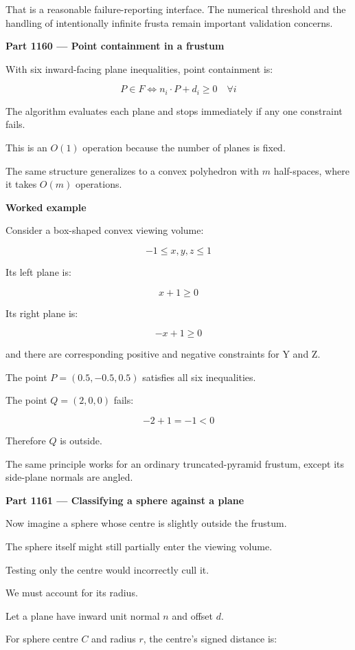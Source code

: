 That is a reasonable failure-reporting interface. The numerical threshold and the handling of intentionally infinite frusta remain important validation concerns.

\textbf{Part 1160 --- Point containment in a frustum}

With six inward-facing plane inequalities, point containment is:

\[
\boxed{ P\in F \iff n_i\cdot P+d_i\ge0 \quad\forall i }
\]

The algorithm evaluates each plane and stops immediately if any one constraint fails.

This is an \(O(1)\) operation because the number of planes is fixed.

The same structure generalizes to a convex polyhedron with \(m\) half-spaces, where it takes \(O(m)\) operations.

\textbf{Worked example}

Consider a box-shaped convex viewing volume:

\[
-1\le x,y,z\le1
\]

Its left plane is:

\[
x+1\ge0
\]

Its right plane is:

\[
-x+1\ge0
\]

and there are corresponding positive and negative constraints for Y and Z.

The point \(P=(0.5,-0.5,0.5)\) satisfies all six inequalities.

The point \(Q=(2,0,0)\) fails:

\[
-2+1=-1<0
\]

Therefore \(Q\) is outside.

The same principle works for an ordinary truncated-pyramid frustum, except its side-plane normals are angled.

\textbf{Part 1161 --- Classifying a sphere against a plane}

Now imagine a sphere whose centre is slightly outside the frustum.

The sphere itself might still partially enter the viewing volume.

Testing only the centre would incorrectly cull it.

We must account for its radius.

Let a plane have inward unit normal \(n\) and offset \(d\).

For sphere centre \(C\) and radius \(r\), the centre's signed distance is:

